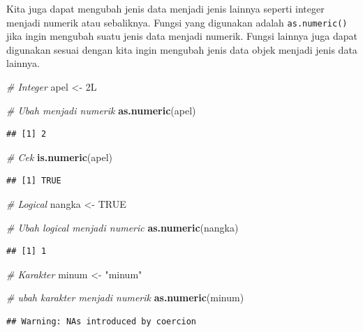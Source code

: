 \documentclass[]{book}
\newenvironment{Shaded}{\begin{snugshade}}{\end{snugshade}}
\newcommand{\KeywordTok}[1]{\textcolor[rgb]{0.13,0.29,0.53}{\textbf{#1}}}
\newcommand{\StringTok}[1]{\textcolor[rgb]{0.31,0.60,0.02}{#1}}
\newcommand{\CommentTok}[1]{\textcolor[rgb]{0.56,0.35,0.01}{\textit{#1}}}
\newcommand{\OtherTok}[1]{\textcolor[rgb]{0.56,0.35,0.01}{#1}}
\newcommand{\NormalTok}[1]{#1}
\begin{document}
Kita juga dapat mengubah jenis data menjadi jenis lainnya seperti
integer menjadi numerik atau sebaliknya. Fungsi yang digunakan adalah
\texttt{as.numeric()} jika ingin mengubah suatu jenis data menjadi
numerik. Fungsi lainnya juga dapat digunakan sesuai dengan kita ingin
mengubah jenis data objek menjadi jenis data lainnya.

\begin{Shaded}
\begin{Highlighting}[]
\CommentTok{# Integer}
\NormalTok{apel <-}\StringTok{ }\NormalTok{2L}

\CommentTok{# Ubah menjadi numerik}
\KeywordTok{as.numeric}\NormalTok{(apel)}
\end{Highlighting}
\end{Shaded}

\begin{verbatim}
## [1] 2
\end{verbatim}

\begin{Shaded}
\begin{Highlighting}[]
\CommentTok{# Cek}
\KeywordTok{is.numeric}\NormalTok{(apel)}
\end{Highlighting}
\end{Shaded}

\begin{verbatim}
## [1] TRUE
\end{verbatim}

\begin{Shaded}
\begin{Highlighting}[]
\CommentTok{# Logical}
\NormalTok{nangka <-}\StringTok{ }\OtherTok{TRUE}

\CommentTok{# Ubah logical menjadi numeric}
\KeywordTok{as.numeric}\NormalTok{(nangka)}
\end{Highlighting}
\end{Shaded}

\begin{verbatim}
## [1] 1
\end{verbatim}

\begin{Shaded}
\begin{Highlighting}[]
\CommentTok{# Karakter}
\NormalTok{minum <-}\StringTok{ "minum"}

\CommentTok{# ubah karakter menjadi numerik}
\KeywordTok{as.numeric}\NormalTok{(minum)}
\end{Highlighting}
\end{Shaded}

\begin{verbatim}
## Warning: NAs introduced by coercion
\end{verbatim}
\end{document}
